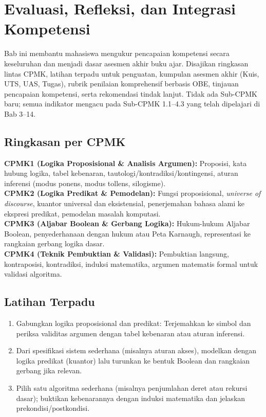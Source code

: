 \documentclass[../main]{subfiles}
\begin{document}
\chapter{Evaluasi, Refleksi, dan Integrasi Kompetensi}

Bab ini membantu mahasiswa mengukur pencapaian kompetensi secara keseluruhan dan menjadi dasar asesmen akhir buku ajar. Disajikan ringkasan lintas CPMK, latihan terpadu untuk penguatan, kumpulan asesmen akhir (Kuis, UTS, UAS, Tugas), rubrik penilaian komprehensif berbasis OBE, tinjauan pencapaian kompetensi, serta rekomendasi tindak lanjut. Tidak ada Sub-CPMK baru; semua indikator mengacu pada Sub-CPMK 1.1--4.3 yang telah dipelajari di Bab 3--14.

\section*{Ringkasan per CPMK}

\textbf{CPMK1 (Logika Proposisional \& Analisis Argumen):} Proposisi, kata hubung logika, tabel kebenaran, tautologi/kontradiksi/kontingensi, aturan inferensi (modus ponens, modus tollens, silogisme).\\
\textbf{CPMK2 (Logika Predikat \& Pemodelan):} Fungsi proposisional, \textit{universe of discourse}, kuantor universal dan eksistensial, penerjemahan bahasa alami ke ekspresi predikat, pemodelan masalah komputasi.\\
\textbf{CPMK3 (Aljabar Boolean \& Gerbang Logika):} Hukum-hukum Aljabar Boolean, penyederhanaan dengan hukum atau Peta Karnaugh, representasi ke rangkaian gerbang logika dasar.\\
\textbf{CPMK4 (Teknik Pembuktian \& Validasi):} Pembuktian langsung, kontraposisi, kontradiksi, induksi matematika, argumen matematis formal untuk validasi algoritma.

\section*{Latihan Terpadu}

\begin{enumerate}
  \item Gabungkan logika proposisional dan predikat: Terjemahkan ke simbol dan periksa validitas argumen dengan tabel kebenaran atau aturan inferensi.
  \item Dari spesifikasi sistem sederhana (misalnya aturan akses), modelkan dengan logika predikat (kuantor) lalu turunkan ke bentuk Boolean dan rangkaian gerbang jika relevan.
  \item Pilih satu algoritma sederhana (misalnya penjumlahan deret atau rekursi dasar); buktikan kebenarannya dengan induksi matematika dan jelaskan prekondisi/postkondisi.
\end{enumerate}
\end{document}
